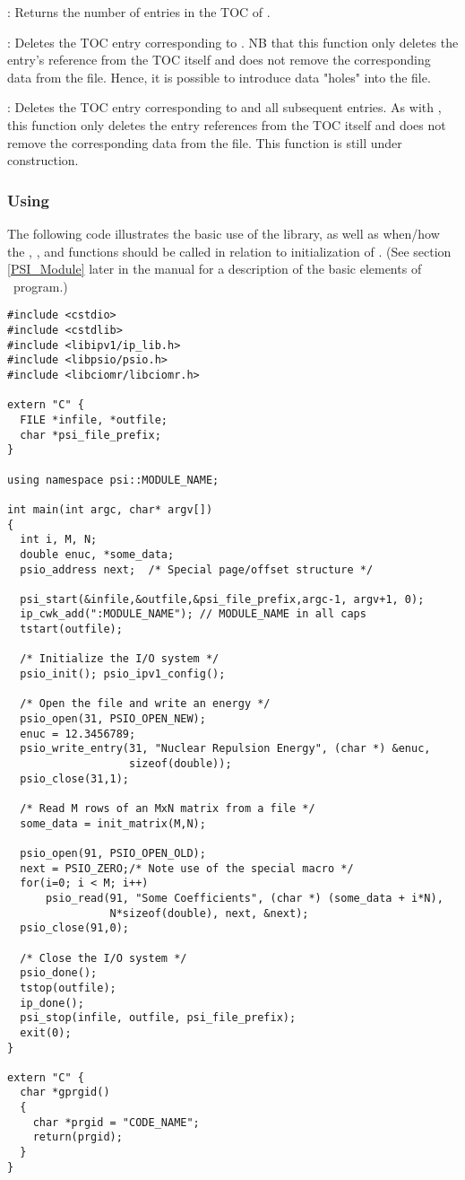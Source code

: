 : Returns the number
of entries in the TOC of .

: Deletes the TOC entry
corresponding to . NB that this function only deletes the
entry's reference from the TOC itself and does not remove the
corresponding data from the file. Hence, it is possible to introduce
data "holes" into the file.

: Deletes the TOC entry
corresponding to  and all subsequent entries. As with
, this function only deletes the entry
references from the TOC itself and does not remove the corresponding
data from the file. This function is still under construction.

\subsubsection{Using }
The following code illustrates the basic use of the library, as well
as when/how the , ,
and  functions should be called in relation to
initialization of .  (See section \ref{PSI_Module}
later in the manual for a description of the basic elements of \PSIthree\
program.)

\begin{verbatim}
#include <cstdio>
#include <cstdlib>
#include <libipv1/ip_lib.h>
#include <libpsio/psio.h>
#include <libciomr/libciomr.h>

extern "C" {
  FILE *infile, *outfile;
  char *psi_file_prefix;
}

using namespace psi::MODULE_NAME;

int main(int argc, char* argv[])
{
  int i, M, N;
  double enuc, *some_data;
  psio_address next;  /* Special page/offset structure */

  psi_start(&infile,&outfile,&psi_file_prefix,argc-1, argv+1, 0);
  ip_cwk_add(":MODULE_NAME"); // MODULE_NAME in all caps
  tstart(outfile);

  /* Initialize the I/O system */
  psio_init(); psio_ipv1_config();

  /* Open the file and write an energy */
  psio_open(31, PSIO_OPEN_NEW);
  enuc = 12.3456789;
  psio_write_entry(31, "Nuclear Repulsion Energy", (char *) &enuc,
                   sizeof(double));
  psio_close(31,1);

  /* Read M rows of an MxN matrix from a file */
  some_data = init_matrix(M,N);

  psio_open(91, PSIO_OPEN_OLD);
  next = PSIO_ZERO;/* Note use of the special macro */
  for(i=0; i < M; i++)
      psio_read(91, "Some Coefficients", (char *) (some_data + i*N),
                N*sizeof(double), next, &next);
  psio_close(91,0);

  /* Close the I/O system */
  psio_done();
  tstop(outfile);
  ip_done();
  psi_stop(infile, outfile, psi_file_prefix);
  exit(0);
}

extern "C" {
  char *gprgid()
  {
    char *prgid = "CODE_NAME";
    return(prgid);
  }
}

\end{verbatim}

